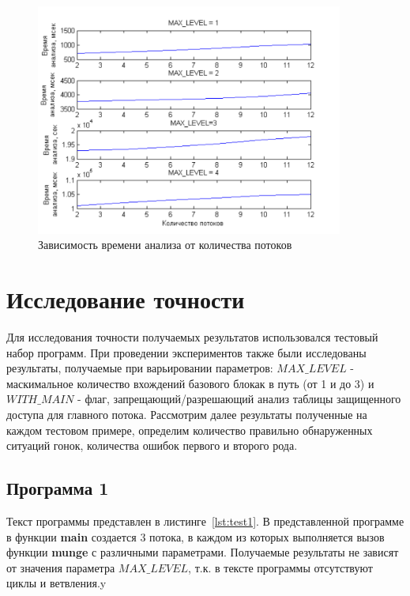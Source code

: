 \begin{figure}[h]
  \centering
  \includegraphics[width=0.9\textwidth]{inc/png/graphic5}
  \caption{Зависимость времени анализа от количества потоков}
  \label{fig:graphic5}
\end{figure}


\section{Исследование точности}

Для исследования точности получаемых результатов использовался тестовый набор программ. При проведении экспериментов также были исследованы результаты, получаемые при варьировании параметров: $MAX\_LEVEL$ - маскимальное количество вхождений базового блокак в путь (от 1 и до 3)  и $WITH\_MAIN$ - флаг, запрещающий/разрешающий анализ таблицы защищенного доступа для главного потока. Рассмотрим далее результаты полученные на каждом тестовом примере, определим количество правильно обнаруженных ситуаций гонок, количества ошибок первого и второго рода.

\subsection{Программа 1}

Текст программы представлен в листинге~\ref{lst:test1}. В представленной программе в функции \textbf{main} создается 3 потока, в каждом из которых выполняется вызов функции \textbf{munge} с различными параметрами. Получаемые результаты не зависят от значения параметра $MAX\_LEVEL$, т.к. в тексте программы отсутствуют циклы и ветвления.y

